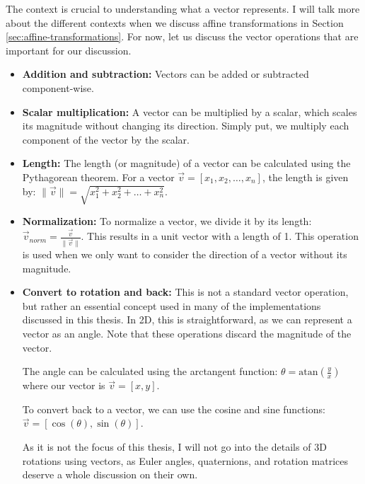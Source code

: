 The context is crucial to understanding what a vector represents. I will talk more about the different contexts when we discuss affine transformations in Section \ref{sec:affine-transformations}. For now, let us discuss the vector operations that are important for our discussion.

\begin{itemize}
    \item \textbf{Addition and subtraction:} Vectors can be added or subtracted component-wise.
    
    \item \textbf{Scalar multiplication:} A vector can be multiplied by a scalar, which scales its magnitude without changing its direction. Simply put, we multiply each component of the vector by the scalar.
    
    \item \textbf{Length:} The length (or magnitude) of a vector can be calculated using the Pythagorean theorem. For a vector \(\vec{v} = [x_1, x_2, \ldots, x_n]\), the length is given by: \(\|\vec{v}\| = \sqrt{x_1^2 + x_2^2 + \ldots + x_n^2}\).
    
    \item \textbf{Normalization: } To normalize a vector, we divide it by its length: \(\vec{v}_{norm} = \frac{\vec{v}}{\|\vec{v}\|}\). This results in a unit vector with a length of 1. This operation is used when we only want to consider the direction of a vector without its magnitude.

\pagebreak

    \item \textbf{Convert to rotation and back: } This is not a standard vector operation, but rather an essential concept used in many of the implementations discussed in this thesis. In 2D, this is straightforward, as we can represent a vector as an angle. Note that these operations discard the magnitude of the vector.
    
    The angle can be calculated using the arctangent function: \(\theta = \text{atan}(\frac{y}{x})\) where our vector is \(\vec{v}=[x,y]\). 
    
    To convert back to a vector, we can use the cosine and sine functions: \(\vec{v} = [\cos(\theta), \sin(\theta)]\). 
        
    As it is not the focus of this thesis, I will not go into the details of 3D rotations using vectors, as Euler angles, quaternions, and rotation matrices deserve a whole discussion on their own.
\end{itemize}

